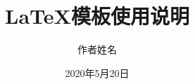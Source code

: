 \documentclass[unicode,master]{scutthesis} %
\renewcommand{\chaptermark}[1]{\markboth{\chaptername\ #1}{}}
\begin{document}
	\title{LaTeX模板使用说明}	
	\author{作者姓名}	
	\date{2020年5月20日}
	\maketitle	
	\frontmatter	%
	\tableofcontents	%
	
	\begingroup
		\renewcommand*{\addvspace}[1]{}
		\newcommand{\loflabel}{图} 
		\renewcommand{\numberline}[1]{\loflabel~#1\hspace*{1em}}	
		\listoffigures
		
		\newcommand{\lotlabel}{表}
		\renewcommand{\numberline}[1]{\lotlabel~#1\hspace*{1em}}
		\listoftables
	\endgroup

	
	\mainmatter %
	
    \pagestyle{fancy}	%
	

	\backmatter %
	\renewcommand{\chaptermark}[1]{\markboth{#1}{}}
	\printbibliography	%
% 	
\end{document}
